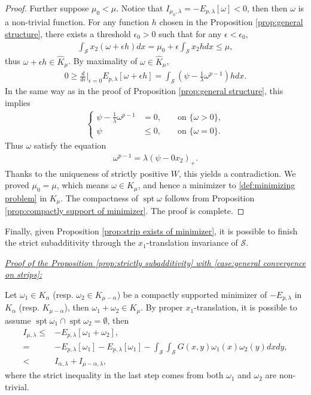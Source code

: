 \documentclass[11pt,letterpaper]{amsart}
\theoremstyle{definition}
\theoremstyle{remark}
\renewcommand{\S}{\mathcal{S}}
\newcommand{\spt}{\operatorname{spt}}
\newcommand{\eps}{\epsilon}
\renewcommand{\tt}[1]{\text{#1}}
\numberwithin{equation}{section}
\begin{document}
\begin{proof}
Further suppose $\mu_0 < \mu$. Notice that $I_{\mu_0,\lambda}=-E_{p,\lambda}[\omega]<0$, then then $\omega$ is a non-trivial function. For any function $h$ chosen in the Proposition \ref{prop:general structure}, there exists a threshold $\eps_0>0$ such that for any $\eps<\eps_0$, 
\begin{align*}
    \int_{\S}x_2(\omega+\eps h)dx=\mu_0+\eps\int_{\S}x_2 h dx \leq \mu,
\end{align*}
thus $\omega+\eps h\in \widehat{K}_\mu$. By maximality of $\omega\in \widehat{K}_{\mu}$, 
\begin{align*}
    0\geq \frac{d}{d\eps}\Bigg|_{\eps=0}E_{p,\lambda}[\omega+\eps h] = \int_{\S} \left( \psi-\frac{1}{\lambda}\omega^{p-1} \right) h dx.
\end{align*}
In the same way as in the proof of Proposition \ref{prop:general structure}, this implies 
\begin{align*}
    \left\{\begin{aligned}
        \psi-\frac{1}{\lambda} \omega^{p-1} & = 0, && \tt{ on } \{\omega>0\}, \\
        \psi & \leq 0, && \tt{ on } \{\omega=0\}.
    \end{aligned}\right.
\end{align*}
Thus $\omega$ satisfy the equation 
\begin{align*}
    \omega^{p-1}=\lambda (\psi- 0 x_2)_+.
\end{align*}
Thanks to the uniqueness of strictly positive $W$, this yields a contradiction. We proved $\mu_0 = \mu$, which means $\omega \in K_{\mu}$, and hence a minimizer to \eqref{def:minimizing problem} in $K_{\mu}$. The compactness of $\spt \omega$ follows from Proposition \ref{prop:compactly support of minimizer}. The proof is complete.

\end{proof}

Finally, given Proposition \ref{prop:strip exists of minimizer}, it is possible to finish the strict subadditivity through the $x_1$-translation invariance of $\S$.

\hfill

\noindent\underline{\textit{Proof of the Proposition \ref{prop:strictly subadditivity} with \ref{case:general convergence on strips}:}}

Let $\omega_1\in K_{\alpha}$ (resp. $\omega_2\in K_{\mu-\alpha}$) be a compactly supported minimizer of $-E_{p,\lambda}$ in $K_{\alpha}$ (resp. $K_{\mu-\alpha}$), then $\omega_1+\omega_2\in K_{\mu}$. By proper $x_1$-translation, it is possible to assume $\spt \omega_1 \cap \spt \omega_2 = \emptyset$, then
\begin{align*}
    I_{\mu,\lambda}
    \leq & -E_{p,\lambda}[\omega_1+\omega_2], \\
    = & - E_{p,\lambda}[\omega_1] - E_{p,\lambda}[\omega_1] - \int_\S \int_\S G(x,y) \omega_1(x) \omega_2(y) dx dy, \\
    < & I_{\alpha,\lambda} + I_{\mu-\alpha,\lambda},
\end{align*}
where the strict inequality in the last step comes from both $\omega_1$ and $\omega_2$ are non-trivial.
\end{document}
